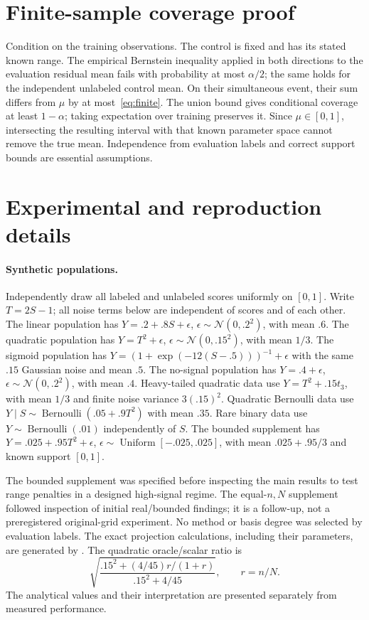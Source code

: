\section{Finite-sample coverage proof}
Condition on the training observations. The control is fixed and has its stated known range. The empirical Bernstein inequality applied in both directions to the evaluation residual mean fails with probability at most $\alpha/2$; the same holds for the independent unlabeled control mean. On their simultaneous event, their sum differs from $\mu$ by at most~\eqref{eq:finite}. The union bound gives conditional coverage at least $1-\alpha$; taking expectation over training preserves it. Since $\mu\in[0,1]$, intersecting the resulting interval with that known parameter space cannot remove the true mean. Independence from evaluation labels and correct support bounds are essential assumptions.

\section{Experimental and reproduction details}\label{app:reproduction}
\paragraph{Synthetic populations.}
Independently draw all labeled and unlabeled scores uniformly on $[0,1]$. Write $T=2S-1$; all noise terms below are independent of scores and of each other. The linear population has $Y=.2+.8S+\epsilon$, $\epsilon\sim\mathcal N(0,.2^2)$, with mean $.6$. The quadratic population has $Y=T^2+\epsilon$, $\epsilon\sim\mathcal N(0,.15^2)$, with mean $1/3$. The sigmoid population has $Y=(1+\exp(-12(S-.5)))^{-1}+\epsilon$ with the same $.15$ Gaussian noise and mean $.5$. The no-signal population has $Y=.4+\epsilon$, $\epsilon\sim\mathcal N(0,.2^2)$, with mean $.4$. Heavy-tailed quadratic data use $Y=T^2+.15t_3$, with mean $1/3$ and finite noise variance $3(.15)^2$. Quadratic Bernoulli data use $Y\mid S\sim\operatorname{Bernoulli}(.05+.9T^2)$ with mean $.35$. Rare binary data use $Y\sim\operatorname{Bernoulli}(.01)$ independently of $S$. The bounded supplement has $Y=.025+.95T^2+\epsilon$, $\epsilon\sim\operatorname{Uniform}[-.025,.025]$, with mean $.025+.95/3$ and known support $[0,1]$.

The bounded supplement was specified before inspecting the main results to test range penalties in a designed high-signal regime. The equal-$n,N$ supplement followed inspection of initial real/bounded findings; it is a follow-up, not a preregistered original-grid experiment. No method or basis degree was selected by evaluation labels. The exact projection calculations, including their parameters, are generated by . The quadratic oracle/scalar ratio is
\[
\sqrt{\frac{.15^2+(4/45)r/(1+r)}{.15^2+4/45}},\qquad r=n/N.
\]
The analytical values and their interpretation are presented separately from measured performance.

